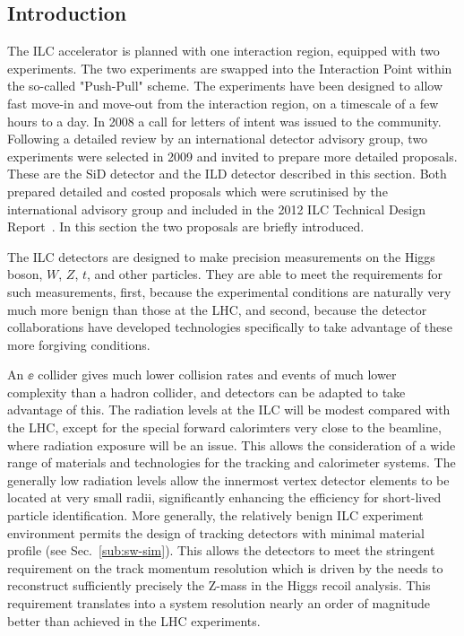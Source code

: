 \subsection{Introduction}

The ILC accelerator is planned with one interaction region, equipped
with two experiments. The two experiments are swapped into the
Interaction Point within the so-called "Push-Pull" scheme. The
experiments have been designed to allow fast move-in and move-out from
the interaction region, on a timescale of a few hours to a day. In
2008 a call for letters of intent was issued to the
community. Following a detailed review by an international detector
advisory group, two experiments were selected in 2009 and invited to
prepare more detailed proposals.  These  are the SiD detector and the ILD
detector described in this section. Both prepared detailed and costed proposals which were
scrutinised by the international advisory group and included in the
2012 ILC
Technical Design Report~\cite{Behnke:2013lya}.  In this section the two proposals are
briefly   introduced.

The ILC detectors are designed to make precision measurements on the
Higgs boson,  $W$, $Z$, $t$, and other particles.    They are able to
meet the requirements for such measurements, first, because the
experimental conditions are naturally very much more benign than those
at the LHC, and second, because the detector collaborations have
developed technologies specifically to take advantage of these more
forgiving conditions. 

An $\ee$ collider gives much  lower collision
rates and events of much lower complexity than a hadron collider, 
and detectors can be adapted to take
advantage of this.  The radiation levels at the ILC will be modest compared with the
LHC, except for the special forward calorimters very close to the
beamline, where radiation exposure will be an issue. 
This  allows the consideration of a wide range of
materials and technologies for the tracking and calorimeter systems. 
The generally low
radiation levels allow the innermost vertex detector elements to
be located at very small  radii, significantly enhancing the efficiency
for short-lived particle identification. More generally,  the relatively
benign ILC experiment environment permits  the design of 
tracking detectors with minimal material profile (see
Sec.~\ref{sub:sw-sim}).  This allows the detectors to meet the
stringent requirement on the track momentum resolution
 which is driven by the needs to reconstruct sufficiently precisely
 the Z-mass in the Higgs recoil analysis.  This requirement translates into a system
 resolution nearly an order of magnitude better than achieved in the
 LHC experiments.

